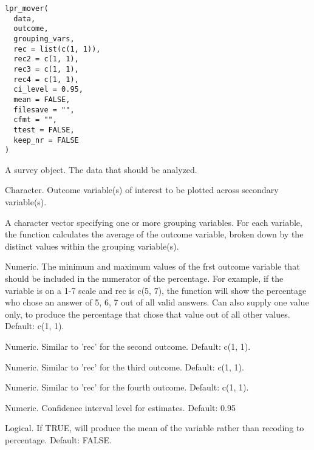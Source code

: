 \documentclass[a4paper]{book}
\begin{document}
%
\begin{Usage}
\begin{verbatim}
lpr_mover(
  data,
  outcome,
  grouping_vars,
  rec = list(c(1, 1)),
  rec2 = c(1, 1),
  rec3 = c(1, 1),
  rec4 = c(1, 1),
  ci_level = 0.95,
  mean = FALSE,
  filesave = "",
  cfmt = "",
  ttest = FALSE,
  keep_nr = FALSE
)
\end{verbatim}
\end{Usage}
%
\begin{Arguments}
\begin{ldescription}
\item[\code{data}] A survey object. The data that should be analyzed.

\item[\code{outcome}] Character. Outcome variable(s) of interest to be plotted across secondary
variable(s).

\item[\code{grouping\_vars}] A character vector specifying one or more grouping variables.
For each variable, the function calculates the average of the outcome variable,
broken down by the distinct values within the grouping variable(s).

\item[\code{rec}] Numeric. The minimum and maximum values of the frst outcome variable that
should be included in the numerator of the percentage.  For example, if the variable
is on a 1-7 scale and rec is c(5, 7), the function will show the percentage who chose
an answer of 5, 6, 7 out of all valid answers.  Can also supply one value only,
to produce the percentage that chose that value out of all other values.
Default: c(1, 1).

\item[\code{rec2}] Numeric. Similar to 'rec' for the second outcome. Default: c(1, 1).

\item[\code{rec3}] Numeric.  Similar to 'rec' for the third outcome. Default: c(1, 1).

\item[\code{rec4}] Numeric.  Similar to 'rec' for the fourth outcome. Default: c(1, 1).

\item[\code{ci\_level}] Numeric. Confidence interval level for estimates.  Default: 0.95

\item[\code{mean}] Logical.  If TRUE, will produce the mean of the variable rather than
recoding to percentage.  Default: FALSE.


\end{ldescription}
\end{Arguments}
\end{document}
